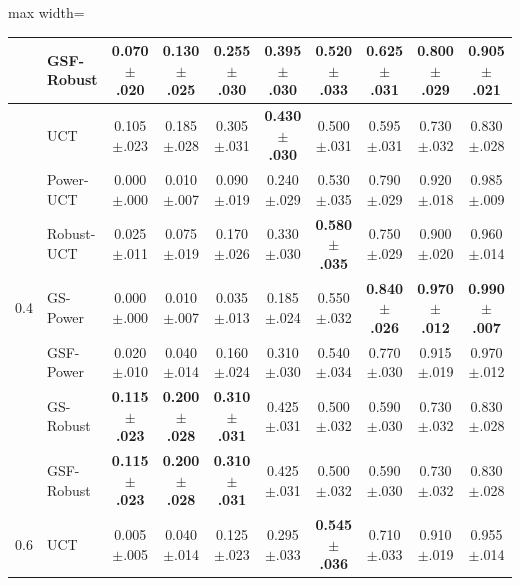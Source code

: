 \begin{table}
\begin{adjustbox}{max width=\linewidth}
\begin{tabular}{llcccccccc}
 & GSF-Robust & 0.070{\scriptsize$\pm$.020} & 0.130{\scriptsize$\pm$.025} & 0.255{\scriptsize$\pm$.030} & 0.395{\scriptsize$\pm$.030} & 0.520{\scriptsize$\pm$.033} & 0.625{\scriptsize$\pm$.031} & 0.800{\scriptsize$\pm$.029} & \textbf{0.905{\scriptsize$\pm$.021}} \\
\midrule
\multirow{7}{*}{0.4} & UCT & 0.105{\scriptsize$\pm$.023} & 0.185{\scriptsize$\pm$.028} & 0.305{\scriptsize$\pm$.031} & \textbf{0.430{\scriptsize$\pm$.030}} & 0.500{\scriptsize$\pm$.031} & 0.595{\scriptsize$\pm$.031} & 0.730{\scriptsize$\pm$.032} & 0.830{\scriptsize$\pm$.028} \\
 & Power-UCT & 0.000{\scriptsize$\pm$.000} & 0.010{\scriptsize$\pm$.007} & 0.090{\scriptsize$\pm$.019} & 0.240{\scriptsize$\pm$.029} & 0.530{\scriptsize$\pm$.035} & 0.790{\scriptsize$\pm$.029} & 0.920{\scriptsize$\pm$.018} & 0.985{\scriptsize$\pm$.009} \\
 & Robust-UCT & 0.025{\scriptsize$\pm$.011} & 0.075{\scriptsize$\pm$.019} & 0.170{\scriptsize$\pm$.026} & 0.330{\scriptsize$\pm$.030} & \textbf{0.580{\scriptsize$\pm$.035}} & 0.750{\scriptsize$\pm$.029} & 0.900{\scriptsize$\pm$.020} & 0.960{\scriptsize$\pm$.014} \\
 & GS-Power & 0.000{\scriptsize$\pm$.000} & 0.010{\scriptsize$\pm$.007} & 0.035{\scriptsize$\pm$.013} & 0.185{\scriptsize$\pm$.024} & 0.550{\scriptsize$\pm$.032} & \textbf{0.840{\scriptsize$\pm$.026}} & \textbf{0.970{\scriptsize$\pm$.012}} & \textbf{0.990{\scriptsize$\pm$.007}} \\
 & GSF-Power & 0.020{\scriptsize$\pm$.010} & 0.040{\scriptsize$\pm$.014} & 0.160{\scriptsize$\pm$.024} & 0.310{\scriptsize$\pm$.030} & 0.540{\scriptsize$\pm$.034} & 0.770{\scriptsize$\pm$.030} & 0.915{\scriptsize$\pm$.019} & 0.970{\scriptsize$\pm$.012} \\
 & GS-Robust & \textbf{0.115{\scriptsize$\pm$.023}} & \textbf{0.200{\scriptsize$\pm$.028}} & \textbf{0.310{\scriptsize$\pm$.031}} & 0.425{\scriptsize$\pm$.031} & 0.500{\scriptsize$\pm$.032} & 0.590{\scriptsize$\pm$.030} & 0.730{\scriptsize$\pm$.032} & 0.830{\scriptsize$\pm$.028} \\
 & GSF-Robust & \textbf{0.115{\scriptsize$\pm$.023}} & \textbf{0.200{\scriptsize$\pm$.028}} & \textbf{0.310{\scriptsize$\pm$.031}} & 0.425{\scriptsize$\pm$.031} & 0.500{\scriptsize$\pm$.032} & 0.590{\scriptsize$\pm$.030} & 0.730{\scriptsize$\pm$.032} & 0.830{\scriptsize$\pm$.028} \\
\midrule
\multirow{7}{*}{0.6} & UCT & 0.005{\scriptsize$\pm$.005} & 0.040{\scriptsize$\pm$.014} & 0.125{\scriptsize$\pm$.023} & 0.295{\scriptsize$\pm$.033} & \textbf{0.545{\scriptsize$\pm$.036}} & 0.710{\scriptsize$\pm$.033} & 0.910{\scriptsize$\pm$.019} & 0.955{\scriptsize$\pm$.014} \\

\end{tabular}
\end{adjustbox}
\end{table}
